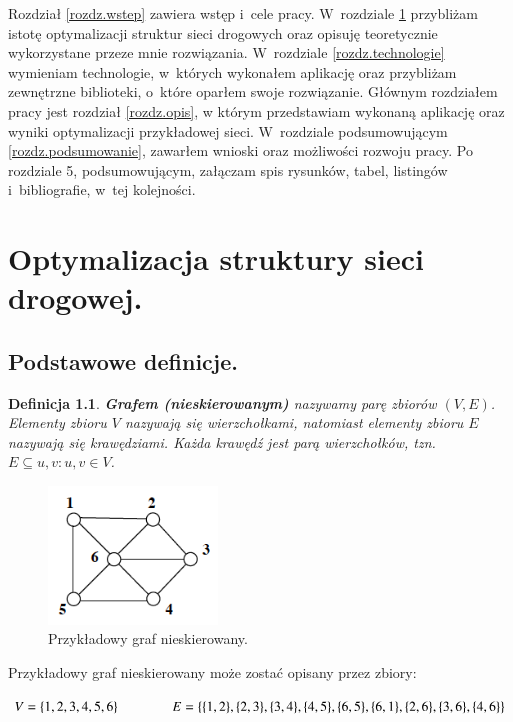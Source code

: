 \documentclass[twoside,12pt]{report}
\let\oldsection\chapter
\def\chapter{\cleardoublepage\oldsection}
\newtheorem{definition}{Definicja} %
\begin{document}
Rozdział \ref{rozdz.wstep} zawiera wstęp i~cele pracy. W~rozdziale \ref{rozdz.optymalizacja} przybliżam istotę optymalizacji struktur sieci drogowych
oraz opisuję teoretycznie wykorzystane przeze mnie rozwiązania. W~rozdziale \ref{rozdz.technologie} wymieniam technologie, w~których wykonałem aplikację oraz przybliżam zewnętrzne biblioteki, o~które oparłem swoje rozwiązanie. Głównym rozdziałem pracy jest rozdział \ref{rozdz.opis},
w którym przedstawiam wykonaną aplikację oraz wyniki optymalizacji przykładowej sieci. W~rozdziale podsumowującym \ref{rozdz.podsumowanie}, zawarłem wnioski oraz możliwości rozwoju pracy. Po rozdziale 5, podsumowującym, załączam spis rysunków, tabel, listingów i~bibliografie, w~tej kolejności.

\chapter{Optymalizacja struktury sieci drogowej.}\label{rozdz.optymalizacja} 
\section{Podstawowe definicje.}

\begin{definition}\label{Graf nieskierowany}
\textbf{Grafem (nieskierowanym)} nazywamy parę zbiorów $(V,E)$. Elementy zbioru $V$ nazywają się \textit{wierzchołkami}, natomiast elementy zbioru $E$ nazywają się \textit{krawędziami}. Każda krawędź jest parą wierzchołków, tzn. $E \subseteq {{u,v}:u,v \in V}$\cite{grafy}.
\end{definition}

\begin{figure}[ht]
\begin{center}
\includegraphics[width=0.40\textwidth]{img/graf1}
\caption{Przykładowy graf nieskierowany.} 
\end{center}
\end{figure}

Przykładowy graf nieskierowany może zostać opisany przez zbiory:
\begin{center}
\begin{math}
V=\{1,2,3,4,5,6\} \hspace*{40px} E=\{\{1,2\},\{2,3\},\{3,4\},\{4,5\},\{6,5\},\{6,1\},\{2,6\},\{3,6\},\{4,6\}\}
\end{math}
\end{center}
\end{document}
